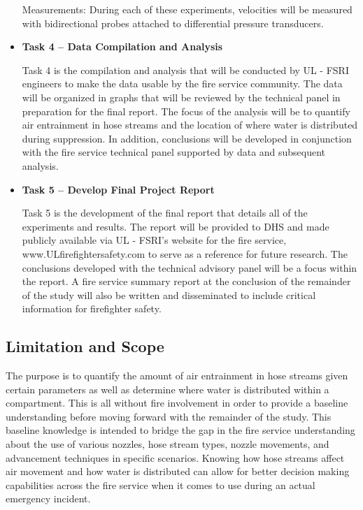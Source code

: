 \documentclass{article}
\begin{document}
\begin{itemize}
Measurements: During each of these experiments, velocities will be measured with bidirectional probes attached to differential pressure transducers. 
\vspace*{\baselineskip}

\item \bf{Task 4 – Data Compilation and Analysis}
\normalfont
\vspace*{\baselineskip}

Task 4 is the compilation and analysis that will be conducted by UL - FSRI engineers to make the data usable by the fire service community. The data will be organized in graphs that will be reviewed by the technical panel in preparation for the final report. The focus of the analysis will be to quantify air entrainment in hose streams and the location of where water is distributed during suppression. In addition, conclusions will be developed in conjunction with the fire service technical panel supported by data and subsequent analysis.
\vspace*{\baselineskip}

\item \bf{Task 5 – Develop Final Project Report}
\normalfont
\vspace*{\baselineskip}

Task 5 is the development of the final report that details all of the experiments and results. The report will be provided to DHS and made publicly available via UL - FSRI's website for the fire service, www.ULfirefightersafety.com to serve as a reference for future research. The conclusions developed with the technical advisory panel will be a focus within the report. A fire service summary report at the conclusion of the remainder of the study will also be written and disseminated to include critical information for firefighter safety.
\vspace*{\baselineskip}

\end{itemize}

\clearpage

\subsection{Limitation and Scope}

The purpose is to quantify the amount of air entrainment in hose streams given certain parameters as well as determine where water is distributed within a compartment. This is all without fire involvement in order to provide a baseline understanding before moving forward with the remainder of the study. This baseline knowledge is intended to bridge the gap in the fire service understanding about the use of various nozzles, hose stream types, nozzle movements, and advancement techniques in specific scenarios. Knowing how hose streams affect air movement and how water is distributed can allow for better decision making capabilities across the fire service when it comes to use during an actual emergency incident.
\end{document}
